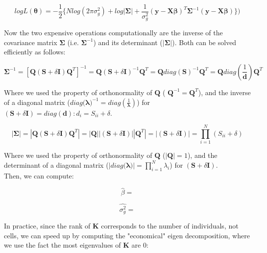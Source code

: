 \begin{equation} \label{eq36}
 logL(\boldsymbol{\theta}) = -\frac{1}{2} \bigg\{Nlog(2\pi\sigma_g^2) + log|\boldsymbol{\Sigma}|+ \frac{1}{\sigma_g^2}(\mathbf{y}-\mathbf{X}\boldsymbol{\beta})^T\boldsymbol{\Sigma}^{-1}(\mathbf{y}-\mathbf{X}\boldsymbol{\beta}) \bigg\}) 
\end{equation}

Now the two expensive operations computationally are the inverse of the covariance matrix $\boldsymbol{\Sigma}$ (i.e. $\boldsymbol{\Sigma}^{-1}$) and its determinant ($|\boldsymbol{\Sigma}|$). 
Both can be solved efficiently as follows:  

\begin{equation}
    \boldsymbol{\Sigma}^{-1} = [\mathbf{Q} (\mathbf{S} + \delta\mathbf{I})\mathbf{Q}^T]^{-1} = \mathbf{Q} (\mathbf{S} + \delta\mathbf{I})^{-1}\mathbf{Q}^T = \mathbf{Q} diag(\mathbf{S})^{-1}\mathbf{Q}^T = \mathbf{Q} diag(\frac{1}{\mathbf{d}})\mathbf{Q}^T
\end{equation}

Where we used the property of orthonormality of $\mathbf{Q}$ ( $\mathbf{Q}^{-1} = \mathbf{Q}^T$), and the inverse of a diagonal matrix ($diag(\boldsymbol{\lambda)}^{-1} = diag(\frac{1}{\boldsymbol{\lambda}})$) for $(\mathbf{S} + \delta\mathbf{I}) = diag(\mathbf{d}): d_i = S_{ii} + \delta$.

\begin{equation}
    |\boldsymbol{\Sigma}| = |\mathbf{Q} (\mathbf{S} + \delta\mathbf{I})\mathbf{Q}^T|= |\mathbf{Q}||(\mathbf{S} + \delta\mathbf{I})||\mathbf{Q}^T| = |(\mathbf{S} + \delta\mathbf{I})| =  \prod_{i=1}^{N} (S_{ii} + \delta)
\end{equation}

Where we used the property of orthonormality of $\mathbf{Q}$ ($|\mathbf{Q}| = 1$), and the determinant of a diagonal matrix ($|diag(\boldsymbol{\lambda)}| = \prod_{i=1}^{N} \lambda_i$) for $(\mathbf{S} + \delta\mathbf{I})$.\\

Then, we can compute:

\begin{equation}
    \hat{\beta} = 
\end{equation}

\begin{equation}
    \hat{\sigma_g^2} =
\end{equation}

In practice, since the rank of $\mathbf{K}$ corresponds to the number of individuals, not cells, we can speed up by computing the "economical" eigen decomposition, where we use the fact the most eigenvalues of $\mathbf{K}$ are 0:

